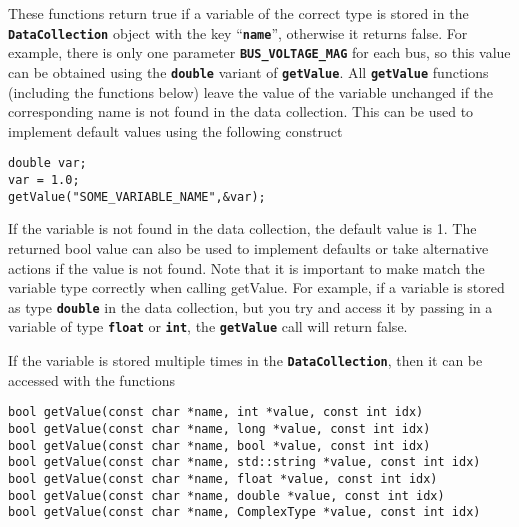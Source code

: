 These functions return true if a variable of the correct type is stored in the \texttt{\textbf{DataCollection}} object with the key ``\texttt{\textbf{name}}'', otherwise it returns false. For example, there is only one parameter \texttt{\textbf{BUS\_VOLTAGE\_MAG}} for each bus, so this value can be obtained using the \texttt{\textbf{double}} variant of \texttt{\textbf{getValue}}.
All \texttt{\textbf{getValue}} functions (including the functions below) leave the value of the variable unchanged if the corresponding name is not found in the data collection. This can be used to implement default values using the following construct

{
\color{red}
\begin{Verbatim}[fontseries=b]
double var;
var = 1.0;
getValue("SOME_VARIABLE_NAME",&var);
\end{Verbatim}
}

If the variable is not found in the data collection, the default value is 1. The
returned bool value can also be used to implement defaults or take alternative
actions if the value is not found. Note that it is important to make match the
variable type correctly when calling getValue. For example, if a variable is
stored as type \texttt{\textbf{double}} in the data collection, but you try and
access it by passing in a variable of type \texttt{\textbf{float}} or
\texttt{\textbf{int}}, the \texttt{\textbf{getValue}} call will return false.

If the variable is stored multiple times in the \texttt{\textbf{DataCollection}}, then it can be accessed with the functions

{
\color{red}
\begin{Verbatim}[fontseries=b]
bool getValue(const char *name, int *value, const int idx)
bool getValue(const char *name, long *value, const int idx)
bool getValue(const char *name, bool *value, const int idx)
bool getValue(const char *name, std::string *value, const int idx)
bool getValue(const char *name, float *value, const int idx)
bool getValue(const char *name, double *value, const int idx)
bool getValue(const char *name, ComplexType *value, const int idx)
\end{Verbatim}
}

